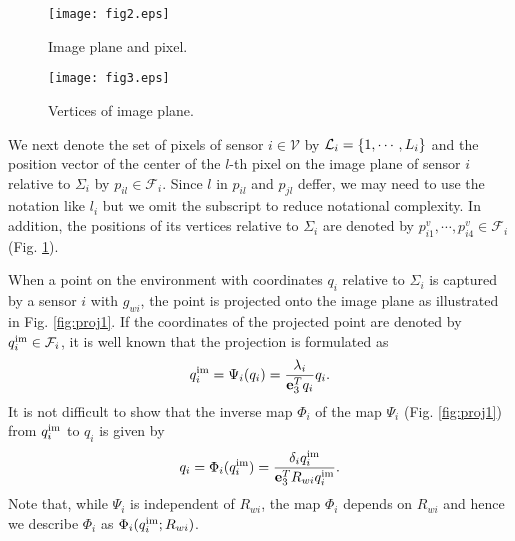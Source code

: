 \documentclass[conference,letterpaper]{ieeeconf}
\newcommand{\V}{{\mathcal V}}
\newcommand{\ewi}{R_{wi}}
\renewcommand{\L}{{\cal L}}
\begin{document}
\begin{figure}[t]
\begin{center}
\begin{minipage}{4cm}
\begin{center}
\texttt{[image: fig2.eps]}
\caption{Image plane and pixel.}
\label{fig:image_plane1}
\end{center}
\end{minipage}
\hspace{.2cm}
\begin{minipage}{4cm}
\begin{center}
\texttt{[image: fig3.eps]}
\caption{Vertices of image plane.}
\label{fig:image_plane2}
\end{center}
\end{minipage}
\end{center}
\end{figure}






We next denote the set of pixels of sensor $i\in \V$ by $\L_i = \{1,\cdots, L_i\}$ and
the position vector of the center of the $l$-th pixel on the image plane of sensor $i$
relative to $\Sigma_i$ by $p_{il} \in {\mathcal F}_i$.
Since $l$ in $p_{il}$ and $p_{jl}$ deffer,
we may need to use the notation like $l_i$ but we omit the subscript
to reduce notational complexity.
In addition, the positions of its vertices relative to 
$\Sigma_i$ are denoted by $p^{v}_{i1}, \cdots, p^{v}_{i4} \in {\mathcal F}_i$
(Fig. \ref{fig:image_plane2}).



When a point on the environment with coordinates $q_i$ relative to $\Sigma_i$
is captured by a sensor $i$ with $g_{wi}$,
the point is projected onto the image plane as illustrated in
Fig. \ref{fig:proj1}.
If the coordinates of the projected point 
are denoted by $q_i^{\rm im} \in {\mathcal F}_i$,
it is well known that the projection is formulated as
\begin{equation}
q_i^{\rm im} = \Psi_i(q_i) = 
\frac{\lambda_i}{{\bf e}_3^Tq_i}
q_i.
\end{equation}
It is not difficult to show that the inverse map $\Phi_i$ 
of the map $\Psi_i$ (Fig. \ref{fig:proj1}) from $q^{\rm im}_i$
to $q_i$ is given by
\begin{equation}
q_i = \Phi_i(q^{\rm im}_{i}) =
\frac{\delta_iq^{\rm im}_{i}}{{\bf e}_3^T \ewi q^{\rm im}_{i}}.
\label{eqn:phi}
\end{equation}
Note that, while $\Psi_i$ is independent of $\ewi$,
the map $\Phi_i$ depends on $\ewi$ and hence we describe $\Phi_i$ as 
$\Phi_i(q^{\rm im}_{i}; \ewi)$.
\end{document}
